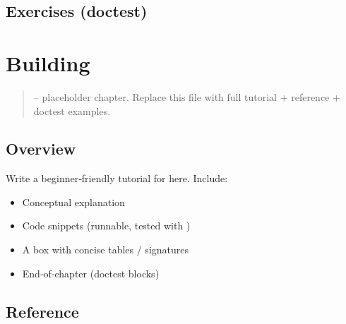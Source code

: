 \documentclass[a4paper,11pt,english]{sphinxmanual}
\begin{document}
\subsection{Exercises (doctest)}
\label{\detokenize{third_party/web_apis:exercises-doctest}}
\begin{sphinxVerbatim}[commandchars=\\\{\}]
\end{sphinxVerbatim}

\sphinxstepscope


\section{Building}
\label{\detokenize{packaging/building:building}}\label{\detokenize{packaging/building::doc}}\begin{quote}

\sphinxAtStartPar
{} – placeholder chapter. Replace this file with full tutorial + reference + doctest examples.
\end{quote}


\subsection{Overview}
\label{\detokenize{packaging/building:overview}}
\sphinxAtStartPar
Write a beginner‑friendly tutorial for  here. Include:
\begin{itemize}
\item {} 
\sphinxAtStartPar
Conceptual explanation

\item {} 
\sphinxAtStartPar
Code snippets (runnable, tested with )

\item {} 
\sphinxAtStartPar
A  box with concise tables / signatures

\item {} 
\sphinxAtStartPar
End‑of‑chapter  (doctest blocks)

\end{itemize}


\subsection{Reference}
\label{\detokenize{packaging/building:reference}}
\end{document}
